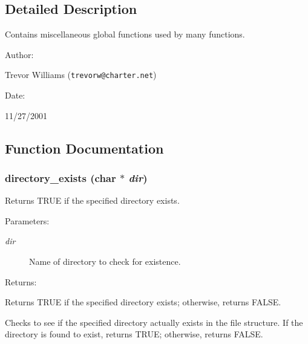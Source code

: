 

\subsection{Detailed Description}
Contains miscellaneous global functions used by many functions.



\begin{Desc}
\item[Author: ]\par
Trevor Williams ({\tt trevorw@charter.net}) \end{Desc}
\begin{Desc}
\item[Date: ]\par
11/27/2001\end{Desc}


\subsection{Function Documentation}
\subsubsection{ directory\_\-exists (char $\ast$ {\em dir})}\label{util_8h_a4}


Returns TRUE if the specified directory exists.

\begin{Desc}
\item[Parameters: ]\par
\begin{description}
\item[{\em 
dir}]Name of directory to check for existence. \end{description}
\end{Desc}
\begin{Desc}
\item[Returns: ]\par
Returns TRUE if the specified directory exists; otherwise, returns FALSE.\end{Desc}
Checks to see if the specified directory actually exists in the file structure. If the directory is found to exist, returns TRUE; otherwise, returns FALSE. 
